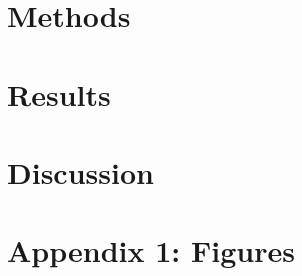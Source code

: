 \documentclass[11pt]{article}
\begin{document}
	\section{Methods}
	\noindent




\section{Results}
\noindent




\section{Discussion}
\noindent



\noindent
\printbibliography 


\section{Appendix 1: Figures}

	
\end{document}
